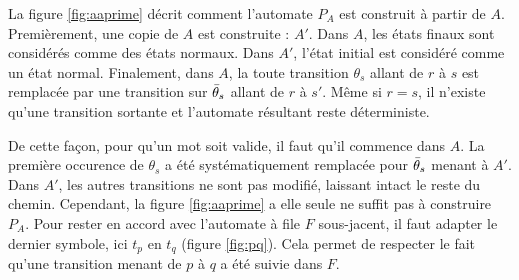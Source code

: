 La figure \ref{fig:aaprime} décrit comment l'automate $P_A$ est construit à partir de $A$. Premièrement, une copie de $A$ est construite : $A'$.
Dans $A$, les états finaux sont considérés comme des états normaux. Dans $A'$, l'état initial est considéré comme un état normal. Finalement, dans $A$, la toute transition $\theta_s$ allant de $r$ à $s$ est remplacée par une transition sur $\bar{\theta}_s$ allant de $r$ à $s'$. Même si $r=s$, il n'existe qu'une transition sortante et l'automate résultant reste déterministe.

De cette façon, pour qu'un mot soit valide, il faut qu'il commence dans $A$. La première occurence de $\theta_s$ a été systématiquement remplacée pour $\bar{\theta}_s$ menant à $A'$. Dans $A'$, les autres transitions ne sont pas modifié, laissant intact le reste du chemin. Cependant, la figure \ref{fig:aaprime} a elle seule ne suffit pas à construire $P_A$. Pour rester en accord avec l'automate à file $F$ sous-jacent, il faut adapter le dernier symbole, ici $t_p$ en $t_q$ (figure \ref{fig:pq}). Cela permet de respecter le fait qu'une transition menant de $p$ à $q$ a été suivie dans $F$.


